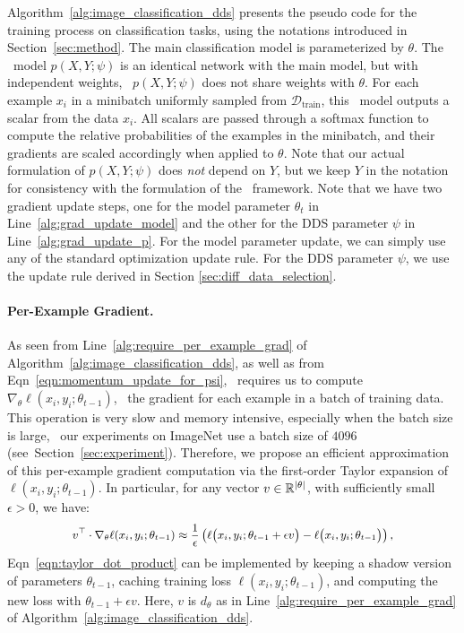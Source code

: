 Algorithm~\ref{alg:image_classification_dds} presents the pseudo code for the training process on classification tasks, using the notations introduced in Section~\ref{sec:method}. 
The main  classification model is parameterized by $\theta$. The \dds~model $p(X, Y; \psi)$ is an identical network with the main model, but with independent weights, \ie~$p(X, Y; \psi)$ does not share weights with $\theta$. For each example $x_i$ in a minibatch uniformly sampled from $\mathcal{D}_\text{train}$, this \dds~model outputs a scalar from the data $x_i$. All scalars are passed through a softmax function to compute the relative probabilities of the examples in the minibatch, and their gradients are scaled accordingly when applied to $\theta$. Note that our actual formulation of $p(X, Y; \psi)$ does \textit{not} depend on $Y$, but we keep $Y$ in the notation for consistency with the formulation of the \dds~framework. Note that we have two gradient update steps, one for the model parameter $\theta_t$ in Line~\ref{alg:grad_update_model} and the other for the DDS parameter $\psi$ in Line~\ref{alg:grad_update_p}. For the model parameter update, we can simply use any of the standard optimization update rule. For the DDS parameter $\psi$, we use the update rule derived in Section \ref{sec:diff_data_selection}.

\paragraph{Per-Example Gradient.} As seen from Line~\ref{alg:require_per_example_grad} of Algorithm~\ref{alg:image_classification_dds}, as well as from Eqn~\ref{eqn:momentum_update_for_psi}, \dds~requires us to compute $\nabla_\theta \ell(x_i, y_i; \theta_{t-1})$, \ie~the gradient for each example in a batch of training data. This operation is very slow and memory intensive, especially when the batch size is large, \eg~our experiments on ImageNet use a batch size of $4096$ (see~Section~\ref{sec:experiment}). Therefore, we propose an efficient approximation of this per-example gradient computation via the first-order Taylor expansion of $\ell(x_i, y_i; \theta_{t-1})$. In particular, for any vector $v \in \mathbb{R}^{\left| \theta \right|}$, with sufficiently small $\epsilon > 0$, we have:
    \vspace{-0.15cm}
\begin{equation}
  \label{eqn:taylor_dot_product}
  \small
  \begin{aligned}
    v^\top \cdot \nabla_\theta \ell(x_i, y_i; \theta_{t-1})
    \approx
    \frac{1}{\epsilon}
    \left(
      \ell\big( x_i, y_i; \theta_{t-1} + \epsilon v \big) -
      \ell\big( x_i, y_i; \theta_{t-1} \big)
    \right),
  \end{aligned}
\end{equation}
Eqn~\ref{eqn:taylor_dot_product} can be implemented by keeping a shadow version of parameters $\theta_{t-1}$, caching training loss $\ell(x_i, y_i; \theta_{t-1})$, and computing the new loss with $\theta_{t-1} + \epsilon v$. Here, $v$ is $d_\theta$ as in Line~\ref{alg:require_per_example_grad} of Algorithm~\ref{alg:image_classification_dds}.

